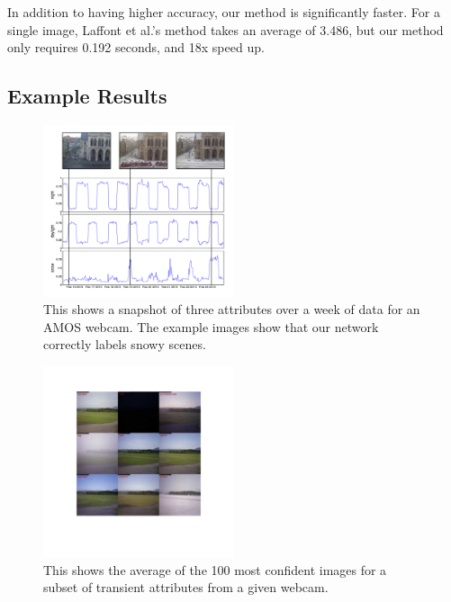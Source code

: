 \documentclass[10pt,twocolumn,letterpaper]{article}
\newcommand{\tblref}[1]{Table~\ref{tbl:#1}}
\begin{document}

In addition to having higher accuracy, our method is significantly
faster.  For a single image, Laffont et al.'s method takes an
average of 3.486, but our method only requires 0.192 seconds, and 18x speed up. 

\subsection{Example Results}

\begin{figure}[t]
	\centering
		\includegraphics[width=0.5\textwidth, trim= 5mm 15mm 0mm 10mm]{figs/attr_compare.pdf}
		\caption{This shows a snapshot of three attributes over a week of data for
             an AMOS webcam.  The example images show that our network 
             correctly labels snowy scenes.}
		\label{fig:attrcmp}
\end{figure}

\begin{figure}[t]
	\centering
		\includegraphics[width=0.5\textwidth, trim= 35mm 50mm 30mm 31mm]{figs/montage_pruned_cam_7211.pdf}
		\caption{This shows the average of the 100 most confident images for
             a subset of transient attributes from a given webcam.} 
		\label{fig:netvis}
\end{figure}
\end{document}
